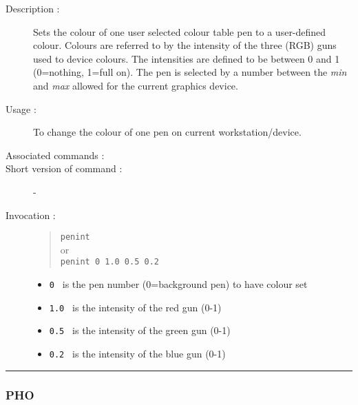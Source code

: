 \begin{description}

\item[Description :] Sets the colour of one user selected colour table
pen to a user-defined colour.  Colours are referred to by the intensity
of the three (RGB) guns used to device colours.  The intensities are
defined to be between 0 and 1 (0=nothing, 1=full on).  The pen is
selected by a number between the {\it min} and {\it max} allowed for
the current graphics device.

\item[Usage :] To change the colour of one pen on current workstation/device.
\item[Associated commands :] {\tt {}}
\item[Short version of command :] -
\item[Invocation :]

\begin{quote}{\tt  penint }\\
or \\
{\tt penint 0 1.0 0.5 0.2 }
\end{quote}

\begin{itemize}

\item {\tt 0 } is the pen number (0=background pen) to have colour set
\item {\tt 1.0 } is the intensity of the red gun (0-1)
\item {\tt 0.5 } is the intensity of the green gun (0-1)
\item {\tt 0.2 } is the intensity of the blue gun (0-1)
\end{itemize}

\end{description}

\hrule
\subsubsection*{\label{PHO}PHO}

